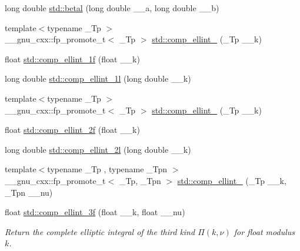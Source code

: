 \begin{DoxyCompactItemize}
\item 
long double \hyperlink{group__tr29124__math__spec__func_ga8caca1cef099f41a88111209c36ce06c}{std\+::betal} (long double \+\_\+\+\_\+a, long double \+\_\+\+\_\+b)
\item 
{\footnotesize template$<$typename \+\_\+\+Tp $>$ }\\\+\_\+\+\_\+gnu\+\_\+cxx\+::fp\+\_\+promote\+\_\+t$<$ \+\_\+\+Tp $>$ \hyperlink{group__tr29124__math__spec__func_gad559217fb01e7a8b7a6e23eeedda64be}{std\+::comp\+\_\+ellint\+\_} (\+\_\+\+Tp \+\_\+\+\_\+k)
\item 
float \hyperlink{group__tr29124__math__spec__func_ga7fb5be999a8125cf7e55e630eb8444a1}{std\+::comp\+\_\+ellint\+\_\+1f} (float \+\_\+\+\_\+k)
\item 
long double \hyperlink{group__tr29124__math__spec__func_ga7247d3dd77c1ff5df3c059fed862dc48}{std\+::comp\+\_\+ellint\+\_\+1l} (long double \+\_\+\+\_\+k)
\item 
{\footnotesize template$<$typename \+\_\+\+Tp $>$ }\\\+\_\+\+\_\+gnu\+\_\+cxx\+::fp\+\_\+promote\+\_\+t$<$ \+\_\+\+Tp $>$ \hyperlink{group__tr29124__math__spec__func_gaadf288465eea84ec609d93de96200aaa}{std\+::comp\+\_\+ellint\+\_} (\+\_\+\+Tp \+\_\+\+\_\+k)
\item 
float \hyperlink{group__tr29124__math__spec__func_ga21700f2f125c42b1f1da1f9c7eea1135}{std\+::comp\+\_\+ellint\+\_\+2f} (float \+\_\+\+\_\+k)
\item 
long double \hyperlink{group__tr29124__math__spec__func_ga47b647ec386c8d4b18a030c97842df18}{std\+::comp\+\_\+ellint\+\_\+2l} (long double \+\_\+\+\_\+k)
\item 
{\footnotesize template$<$typename \+\_\+\+Tp , typename \+\_\+\+Tpn $>$ }\\\+\_\+\+\_\+gnu\+\_\+cxx\+::fp\+\_\+promote\+\_\+t$<$ \+\_\+\+Tp, \+\_\+\+Tpn $>$ \hyperlink{group__tr29124__math__spec__func_ga80419d323d3231870bd588525e818974}{std\+::comp\+\_\+ellint\+\_} (\+\_\+\+Tp \+\_\+\+\_\+k, \+\_\+\+Tpn \+\_\+\+\_\+nu)
\item 
float \hyperlink{group__tr29124__math__spec__func_ga76834d3112f777703330892303267a39}{std\+::comp\+\_\+ellint\+\_\+3f} (float \+\_\+\+\_\+k, float \+\_\+\+\_\+nu)
\begin{DoxyCompactList}\small\item\em Return the complete elliptic integral of the third kind $ \Pi(k,\nu) $ for {\ttfamily float} modulus $ k $. \end{DoxyCompactList}\item 

\end{DoxyCompactItemize}
